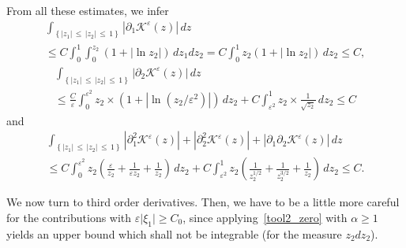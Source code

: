 \documentclass[10pt]{amsart}
\theoremstyle{definition}\newtheorem{defi}[theo]{Definition}\newtheorem{rema}[theo]{Remark}\newtheorem{exam}[theo]{Example}\newtheorem{exem}[theo]{Example}\newtheorem{nota}[theo]{Notation}
\newcommand*\p{\partial}
\newcommand*\BK{\mathcal{K}}
\newcommand*\gs{\geqslant }
\newcommand*\ls{\leqslant }
\newcommand*\e{\varepsilon}
\begin{document}
From all these estimates, we infer
\begin{multline*}
\int_{\left\{ |z_1 |\,\ls\,|z_2|\,\ls\,1\right\}} \left\lvert \p_1 \BK^\e (z)\right\rvert\, dz  \\
\ls C \int_0^1 \int_0^{z_2} (1+ \lvert \ln z_2 \rvert) \, dz_1 dz_2 = C \int_0^1 z_2 (1+ \lvert \ln z_2 \rvert) \, dz_2
\ls C,
\end{multline*}
\begin{multline*}
\int_{\left\{ |z_1 |\,\ls\,|z_2|\,\ls\,1\right\}} \lvert \p_2 \BK^\e (z) \rvert\, dz \\
\ls \frac{C}{\e} \int_0^{\e^2} z_2 \times \left(1 + \left\lvert \ln \left(z_2/\e^2\right) \right\rvert \right) \, dz_2 + C \int_{\e^2}^1 z_2 \times \frac{1}{\sqrt{z_2}} \, dz_2
\ls C
\end{multline*}
and
\begin{multline*}
\int_{\left\{ |z_1 |\,\ls\,|z_2|\,\ls\,1\right\}}
\left\lvert \p_1^2 \BK^\e (z)\right\rvert + \left\lvert \p_2^2 \BK^\e (z) \right\rvert + \left\lvert \p_1 \p_2 \BK^\e (z)\right\rvert \, dz
\\  \ls C \int_0^{\e^2} z_2 \left(\frac{\e}{z_2} + \frac{1}{\e z_2 } + \frac{1}{z_2} \right) \, dz_2 + C \int_{\e^2}^1 z_2 \left(\frac{1}{z_2^{1/2}} + \frac{1}{z_2^{3/2} } + \frac{1}{ z_2} \right) \, dz_2
\ls C.
\end{multline*}

We now turn to third order derivatives. Then, we have to be a little more careful for the contributions with $ \e \lvert \xi_1 \rvert \gs C_0 $, since applying~\eqref{tool2_zero} with $ \alpha \gs 1 $ yields an upper bound which shall not be integrable (for the measure $ z_2 d z_2 $).
\end{document}
